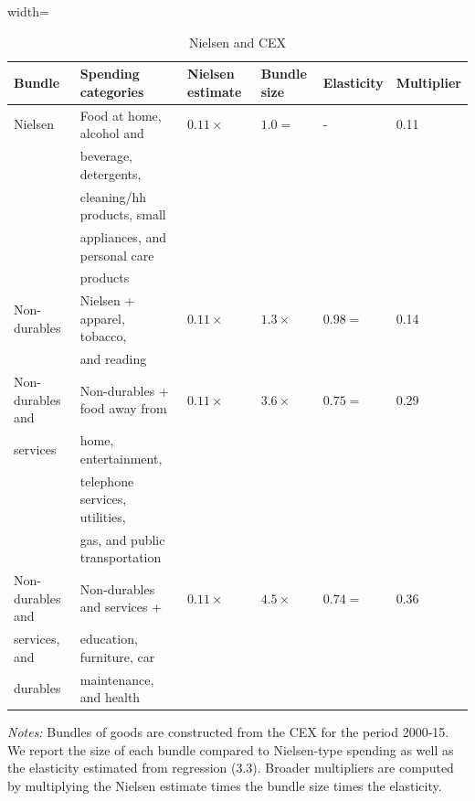 \documentclass[\latexroot/\projectname]{subfiles}
\begin{document}
\begin{table}[h]
  \centering
  \caption{Nielsen and CEX\whenintegrated{\label{tab:empirics-nielsen-cex}}}
  \begin{adjustbox}{width=\textwidth}
  \begin{tabular}{llllll}
    \hline
    \textbf{Bundle} & \textbf{Spending categories} & \textbf{Nielsen estimate} & \textbf{Bundle size} & \textbf{Elasticity} & \textbf{Multiplier} \\
    \hline
    Nielsen & Food at home, alcohol and  & $0.11 \times$ & $1.0=$ & - & 0.11 \\
    &\hspace{1em}beverage, detergents,&&&& \\
    &\hspace{1em}cleaning/hh products, small &&&& \\
    &\hspace{1em}appliances, and personal care&&&& \\
    &\hspace{1em}products&&&& \\
    Non-durables & Nielsen + apparel, tobacco, & $0.11 \times$ & $1.3 \times$ & $0.98=$ & 0.14 \\
    &\hspace{1em}and reading &&& \\
    Non-durables and & Non-durables + food away from & $0.11 \times$ & $3.6 \times$ & $0.75=$ & 0.29 \\
    \hspace{1em}services & \hspace{1em}home, entertainment,&&&& \\
    &\hspace{1em}telephone services, utilities, &&&& \\
    &\hspace{1em}gas, and public transportation&&&& \\
    Non-durables and & Non-durables and services +& $0.11 \times$ & $4.5 \times$ & $0.74=$ & 0.36 \\
    \hspace{1em}services, and &\hspace{1em}education, furniture, car &&&& \\
    \hspace{1em}durables&\hspace{1em}maintenance, and health&&&& \\
  \end{tabular}
  \end{adjustbox}
  \begin{flushleft}
    \footnotesize
    \textit{Notes:} Bundles of goods are constructed from the CEX for the period 2000-15. We report the size of each bundle compared to Nielsen-type spending as well as the elasticity estimated from regression (3.3). Broader multipliers are computed by multiplying the Nielsen estimate times the bundle size times the elasticity.
  \end{flushleft}
\end{table}


\smartbib
\end{document}
